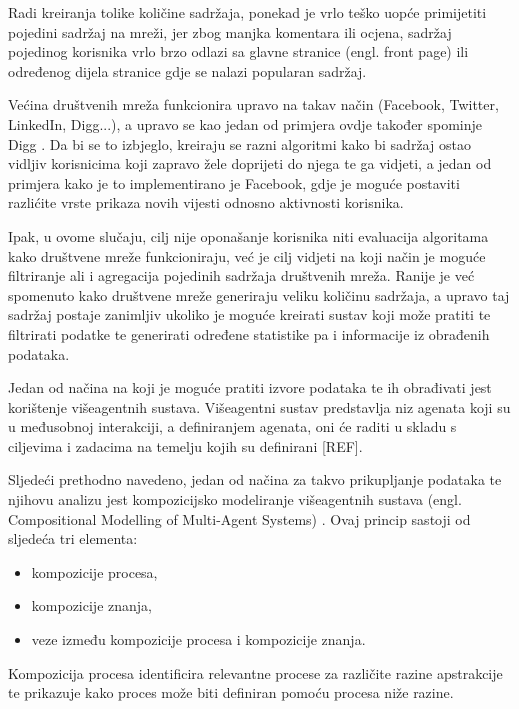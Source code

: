 \documentclass[a4paper,12pt]{foi}
\begin{document}
Radi kreiranja tolike količine sadržaja, ponekad je vrlo teško uopće primijetiti pojedini sadržaj na mreži, jer zbog manjka komentara ili ocjena, sadržaj pojedinog korisnika vrlo brzo odlazi sa glavne stranice (engl. front page) ili određenog dijela stranice gdje se nalazi popularan sadržaj.

Većina društvenih mreža funkcionira upravo na takav način (Facebook, Twitter, LinkedIn, Digg...), a upravo se kao jedan od primjera ovdje također spominje Digg \citep{Lerman2008}. Da bi se to izbjeglo, kreiraju se razni algoritmi kako bi sadržaj ostao vidljiv korisnicima koji zapravo žele doprijeti do njega te ga vidjeti, a jedan od primjera kako je to implementirano je Facebook, gdje je moguće postaviti razlićite vrste prikaza novih vijesti odnosno aktivnosti korisnika.

Ipak, u ovome slučaju, cilj nije oponašanje korisnika niti evaluacija algoritama kako društvene mreže funkcioniraju, već je cilj vidjeti na koji način je moguće filtriranje ali i agregacija pojedinih sadržaja društvenih mreža. Ranije je već spomenuto kako društvene mreže generiraju veliku količinu sadržaja, a upravo taj sadržaj postaje zanimljiv ukoliko je moguće kreirati sustav koji može pratiti te filtrirati podatke te generirati određene statistike pa i informacije iz obrađenih podataka.

Jedan od načina na koji je moguće pratiti izvore podataka te ih obrađivati jest korištenje višeagentnih sustava. Višeagentni sustav predstavlja niz agenata koji su u međusobnoj interakciji, a definiranjem agenata, oni će raditi u skladu s ciljevima i zadacima na temelju kojih su definirani [REF]. 

Sljedeći prethodno navedeno, jedan od načina za takvo prikupljanje podataka te njihovu analizu jest kompozicijsko modeliranje višeagentnih sustava (engl. Compositional Modelling of Multi-Agent Systems) \citep{JonkerTreur2002}. Ovaj princip sastoji od sljedeća tri elementa:

\begin{itemize}
\item{kompozicije procesa,}
\item{kompozicije znanja,}
\item{veze između kompozicije procesa i kompozicije znanja.}
\end{itemize}

Kompozicija procesa identificira relevantne procese za različite razine apstrakcije te prikazuje kako proces može biti definiran pomoću procesa niže razine.
\end{document}
